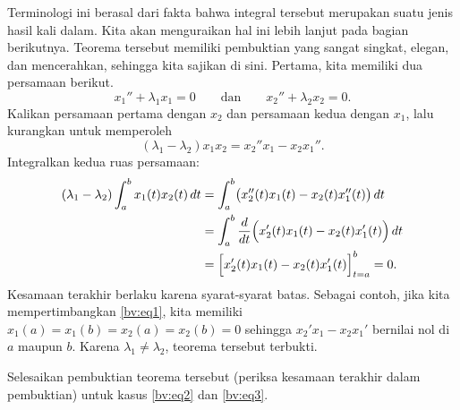 Terminologi ini berasal dari fakta bahwa integral tersebut merupakan suatu jenis
hasil kali dalam.  Kita akan menguraikan hal ini lebih lanjut pada bagian berikutnya.  Teorema tersebut
memiliki pembuktian yang sangat singkat, elegan, dan mencerahkan, sehingga kita sajikan di sini.
Pertama, kita memiliki dua persamaan berikut.
\begin{equation*}
x_1'' + \lambda_1 x_1 = 0
\qquad \text{dan} \qquad
x_2'' + \lambda_2 x_2 = 0.
\end{equation*}
Kalikan persamaan pertama dengan $x_2$ dan persamaan kedua dengan $x_1$, lalu kurangkan untuk memperoleh
\begin{equation*}
(\lambda_1 - \lambda_2) x_1 x_2 = x_2'' x_1 - x_2 x_1'' .
\end{equation*}
Integralkan kedua ruas persamaan:
\begin{equation*}
\begin{split}
(\lambda_1 - \lambda_2) \int_a^b x_1(t) x_2(t) \,dt
& =
\int_a^b \bigl( x_2''(t) x_1(t) - x_2(t) x_1''(t) \bigr) \,dt \\
& =
\int_a^b \frac{d}{dt} \Bigl( x_2'(t) x_1(t) - x_2(t) x_1'(t) \Bigr) \,dt \\
& =
\Bigl[ x_2'(t) x_1(t) - x_2(t) x_1'(t) \Bigr]_{t=a}^b
= 0 .
\end{split}
\end{equation*}
Kesamaan terakhir berlaku karena syarat-syarat batas.  Sebagai contoh, jika
kita mempertimbangkan \eqref{bv:eq1}, kita memiliki $x_1(a) = x_1(b) = x_2(a) = x_2(b) = 0$
sehingga $x_2' x_1 - x_2 x_1'$ bernilai nol di $a$ maupun $b$.
Karena $\lambda_1 \neq \lambda_2$, teorema tersebut terbukti.

\begin{exercise}[mudah]
Selesaikan pembuktian teorema tersebut (periksa kesamaan terakhir dalam pembuktian) untuk kasus
\eqref{bv:eq2} dan \eqref{bv:eq3}.
\end{exercise}


